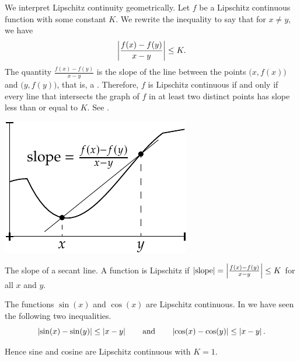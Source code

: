 We interpret Lipschitz continuity geometrically.  Let $f$ be a Lipschitz
continuous function with some constant $K$.  We rewrite the inequality 
to say that for $x \not=y$, we have
\begin{equation*}
\left\lvert {\frac{f(x)-f(y)}{x-y}} \right\rvert \leq K .
\end{equation*}
The quantity $\frac{f(x)-f(y)}{x-y}$ is the slope of the line
between the points $\bigl(x,f(x)\bigr)$
and $\bigl(y,f(y)\bigr)$, that is, a \emph{}.  Therefore, $f$ is Lipschitz
continuous if and only if every line that intersects the graph of $f$ in at least two
distinct
points has slope less than or equal to $K$.  See .
\begin{myfigureht}
\includegraphics{figures/lipschitzfig}
\caption{The slope of a secant line.
A function is Lipschitz if $\left\lvert {\text{slope}} \right\rvert =
\left\lvert {\frac{f(x)-f(y)}{x-y}} \right\rvert \leq K$ for all $x$ and $y$.\label{fig:lipschitz}}
\end{myfigureht}

\begin{example}
The functions $\sin(x)$ and $\cos(x)$ are Lipschitz continuous.
In  we have seen the following two inequalities.
\begin{equation*}
\left\lvert {\sin(x)-\sin(y)} \right\rvert 
\leq \left\lvert {x-y} \right\rvert
\qquad \text{and} \qquad
\left\lvert {\cos(x)-\cos(y)} \right\rvert
\leq \left\lvert {x-y} \right\rvert .
\end{equation*}

Hence sine and cosine are Lipschitz continuous with $K=1$.
\end{example}

